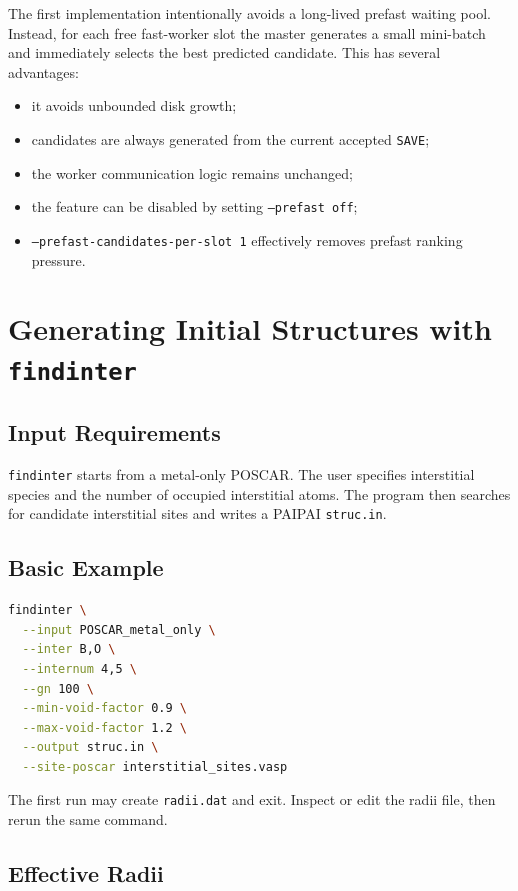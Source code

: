 \documentclass[11pt]{article}
\newcommand{\PAIPAI}{\textsc{PAIPAI}}
\begin{document}
The first implementation intentionally avoids a long-lived prefast waiting pool.
Instead, for each free fast-worker slot the master generates a small mini-batch and immediately selects the best predicted candidate.
This has several advantages:

\begin{itemize}
  \item it avoids unbounded disk growth;
  \item candidates are always generated from the current accepted \texttt{SAVE};
  \item the worker communication logic remains unchanged;
  \item the feature can be disabled by setting \texttt{--prefast off};
  \item \texttt{--prefast-candidates-per-slot 1} effectively removes prefast ranking pressure.
\end{itemize}

\section{Generating Initial Structures with \texttt{findinter}}

\subsection{Input Requirements}

\texttt{findinter} starts from a metal-only POSCAR.
The user specifies interstitial species and the number of occupied interstitial atoms.
The program then searches for candidate interstitial sites and writes a \PAIPAI{} \texttt{struc.in}.

\subsection{Basic Example}

\begin{lstlisting}[language=bash]
findinter \
  --input POSCAR_metal_only \
  --inter B,O \
  --internum 4,5 \
  --gn 100 \
  --min-void-factor 0.9 \
  --max-void-factor 1.2 \
  --output struc.in \
  --site-poscar interstitial_sites.vasp
\end{lstlisting}

The first run may create \texttt{radii.dat} and exit.
Inspect or edit the radii file, then rerun the same command.

\subsection{Effective Radii}
\end{document}
